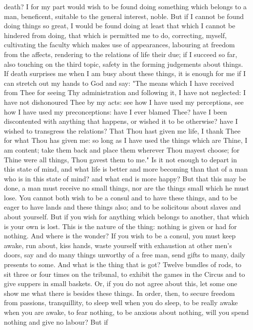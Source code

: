 \documentclass[a4paper]{article}
\begin{document}
death? I for my part would wish to be found doing something which belongs to a
man, beneficent, suitable to the general interest, noble. But if I cannot be
found doing things so great, I would be found doing at least that which I
cannot be hindered from doing, that which is permitted me to do, correcting,
myself, cultivating the faculty which makes use of appearances, labouring at
freedom from the affects, rendering to the relations of life their due; if I
succeed so far, also touching on the third topic, safety in the forming
judgements about things. If death surprises me when I am busy about these
things, it is enough for me if I can stretch out my hands to God and say:
    "The means which I have received from Thee for seeing Thy administration
and following it, I have not neglected: I have not dishonoured Thee by my acts:
see how I have used my perceptions, see how I have used my preconceptions: have
I ever blamed Thee? have I been discontented with anything that happens, or
wished it to be otherwise? have I wished to transgress the relations? That Thou
hast given me life, I thank Thee for what Thou has given me: so long as I have
used the things which are Thine, I am content; take them back and place them
wherever Thou mayest choose; for Thine were all things, Thou gavest them to
me." Is it not enough to depart in this state of mind, and what life is better
and more becoming than that of a man who is in this state of mind? and what end
is more happy?
    But that this may be done, a man must receive no small things, nor are the
things small which he must lose. You cannot both wish to be a consul and to
have these things, and to be eager to have lands and these things also; and to
be solicitous about slaves and about yourself. But if you wish for anything
which belongs to another, that which is your own is lost. This is the nature of
the thing: nothing is given or had for nothing. And where is the wonder? If you
wish to be a consul, you must keep awake, run about, kiss hands, waste yourself
with exhaustion at other men's doors, say and do many things unworthy of a free
man, send gifts to many, daily presents to some. And what is the thing that is
got? Twelve bundles of rods, to sit three or four times on the tribunal, to
exhibit the games in the Circus and to give suppers in small baskets. Or, if
you do not agree about this, let some one show me what there is besides these
things. In order, then, to secure freedom from passions, tranquillity, to sleep
well when you do sleep, to be really awake when you are awake, to fear nothing,
to be anxious about nothing, will you spend nothing and give no labour? But if
\end{document}

